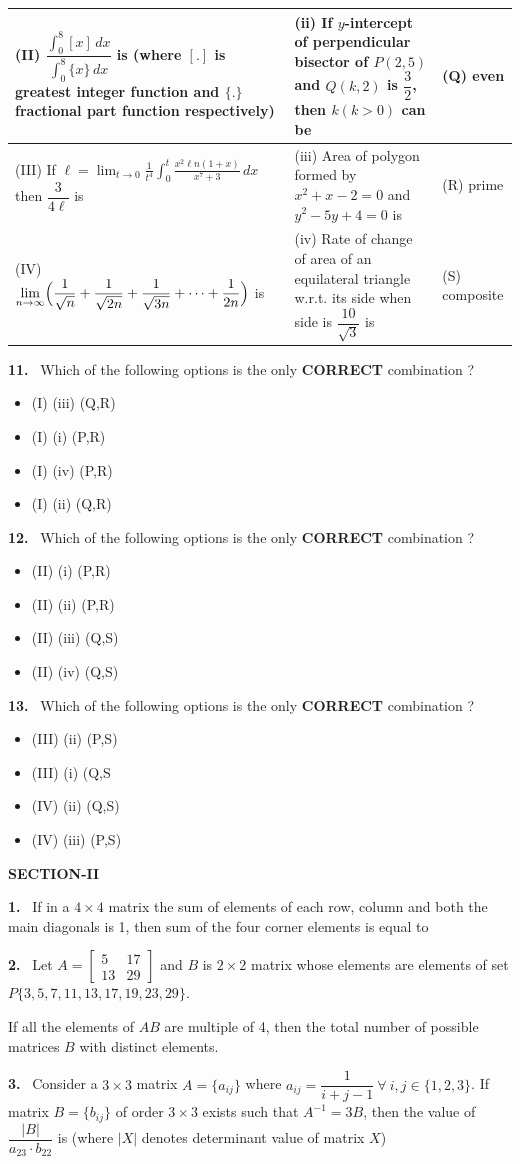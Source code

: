 \documentclass[10pt]{extarticle}
\newcommand{\sect}[1]{\par\smallskip\noindent\textbf{#1}\par}
\newcommand{\qn}[1]{\par\smallskip\noindent\textbf{#1.}~}
\newenvironment{qoptions}{\begin{itemize}[leftmargin=1.8em,itemsep=1pt,topsep=2pt,label={}]}{\end{itemize}}
\newcommand{\opt}[2]{\item[(#1)] #2}
\begin{document}
\begin{multicols}{2}
\begin{center}
\begin{tabular}{|L{3.5cm}|L{2.8cm}|L{1.2cm}|}
(II) $\dfrac{\displaystyle\int_0^8[x]\,dx}{\displaystyle\int_0^8\{x\}\,dx}$ is (where $[.]$ is greatest integer function and $\{.\}$ fractional part function respectively)&(ii) If $y$-intercept of perpendicular bisector of $P(2,5)$ and $Q(k,2)$ is $\dfrac32$, then $k(k>0)$ can be&(Q) even\\\hline
(III) If $\ell=\displaystyle\lim_{t\to0}\frac1{t^4}\int_0^t\frac{x^2\ell n(1+x)}{x^7+3}\,dx$ then $\dfrac3{4\ell}$ is&(iii) Area of polygon formed by $x^2+x-2=0$ and $y^2-5y+4=0$ is&(R) prime\\\hline
(IV) $\displaystyle\lim_{n\to\infty}\Bigl(\dfrac1{\sqrt n}+\dfrac1{\sqrt{2n}}+\dfrac1{\sqrt{3n}}+\dots+\dfrac1{2n}\Bigr)$ is&(iv) Rate of change of area of an equilateral triangle w.r.t. its side when side is $\dfrac{10}{\sqrt3}$ is&(S) composite\\\hline
\end{tabular}\end{center}
\qn{11} Which of the following options is the only \textbf{CORRECT} combination ?
\begin{qoptions}
\opt{A}{(I) (iii) (Q,R)}
\opt{B}{(I) (i) (P,R)}
\opt{C}{(I) (iv) (P,R)}
\opt{D}{(I) (ii) (Q,R)}
\end{qoptions}
\qn{12} Which of the following options is the only \textbf{CORRECT} combination ?
\begin{qoptions}
\opt{A}{(II) (i) (P,R)}
\opt{B}{(II) (ii) (P,R)}
\opt{C}{(II) (iii) (Q,S)}
\opt{D}{(II) (iv) (Q,S)}
\end{qoptions}
\qn{13} Which of the following options is the only \textbf{CORRECT} combination ?
\begin{qoptions}
\opt{A}{(III) (ii) (P,S)}
\opt{B}{(III) (i) (Q,S}
\opt{C}{(IV) (ii) (Q,S)}
\opt{D}{(IV) (iii) (P,S)}
\end{qoptions}
\sect{SECTION-II}
\qn{1} If in a $4\times4$ matrix the sum of elements of each row, column and both the main diagonals is 1, then sum of the four corner elements is equal to
\qn{2} Let $A=\begin{bmatrix}5&17\\13&29\end{bmatrix}$ and $B$ is $2\times2$ matrix whose elements are elements of set $P\{3,5,7,11,13,17,19,23,29\}$.\par
If all the elements of $AB$ are multiple of 4, then the total number of possible matrices $B$ with distinct elements.
\qn{3} Consider a $3\times3$ matrix $A=\{a_{ij}\}$ where $a_{ij}=\dfrac1{i+j-1}\ \forall\ i,j\in\{1,2,3\}$. If matrix $B=\{b_{ij}\}$ of order $3\times3$ exists such that $A^{-1}=3B$, then the value of $\dfrac{|B|}{a_{23}\cdot b_{22}}$ is (where $|X|$ denotes determinant value of matrix $X$)

\end{multicols}
\end{document}
